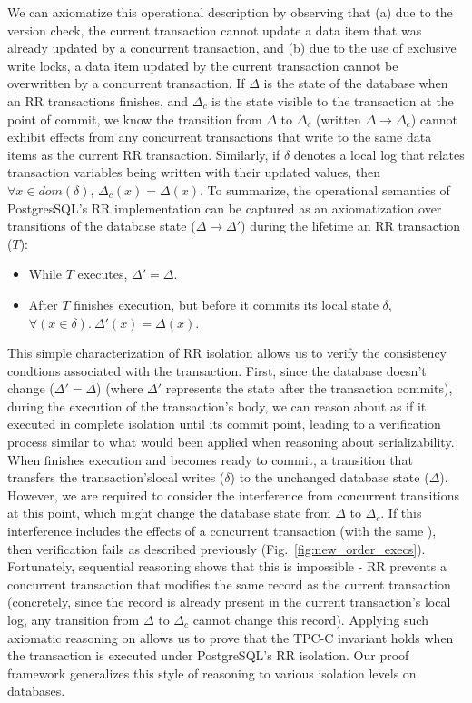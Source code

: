We can axiomatize this operational description by observing that (a)
due to the version check, the current transaction cannot update a data
item that was already updated by a concurrent transaction, and (b) due
to the use of exclusive write locks, a data item updated by the
current transaction cannot be overwritten by a concurrent transaction.
If $\Delta$ is the state of the database when an RR transactions
finishes, and $\Delta_c$ is the state visible to the transaction at
the point of commit, we know the transition from $\Delta$ to
$\Delta_c$ (written $\Delta \longrightarrow \Delta_c$) cannot exhibit
effects from any concurrent transactions that write to the same data
items as the current RR transaction.  Similarly, if $\delta$ denotes
a local log that relates transaction variables being written with their updated values,
then $\forall x\in\mathit{dom}(\delta)$, $\Delta_c(x) =
\Delta(x)$. To summarize, the operational semantics of PostgresSQL's RR
implementation can be captured as an axiomatization over transitions of
the database state ($\Delta \longrightarrow \Delta'$) during the
lifetime an RR transaction ($T$):
\begin{itemize}
  \item While $T$ executes, $\Delta' = \Delta$.
  \item After $T$ finishes execution, but before it commits its local
    state $\delta$, $\forall(x\in\delta).~\Delta'(x) = \Delta(x)$.
\end{itemize}

This simple characterization of RR isolation allows us to verify the
consistency condtions associated with the 
transaction. First, since the database doesn't change ($\Delta' =
\Delta$) (where $\Delta'$ represents the state after the transaction
commits), during the execution of the transaction's body, we can
reason about  as if it executed in complete isolation
until its commit point, leading to a verification process similar to
what would been applied when reasoning about serializability.  When
 finishes execution and becomes ready to commit, a
transition that transfers the transaction'slocal writes ($\delta$) to
the unchanged database state ($\Delta$).  However, we are required to
consider the interference from concurrent transitions at this point,
which might change the database state from $\Delta$ to $\Delta_c$. If
this interference includes the effects of a concurrent 
transaction (with the same ), then verification fails as
described previously (Fig.~\ref{fig:new_order_execs}). Fortunately,
sequential reasoning shows that this is impossible - RR prevents a
concurrent  transaction that modifies the same
 record as the current transaction (concretely, since the
record is already present in the current transaction's local log, any
transition from $\Delta$ to $\Delta_c$ cannot change this record).
Applying such axiomatic reasoning on  allows us to prove
that the TPC-C invariant holds when the transaction is executed under
PostgreSQL's RR isolation.  Our proof framework generalizes this style
of reasoning to various isolation levels on databases.

